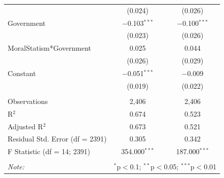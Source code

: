 \documentclass[12pt,]{article}
\begin{document}
\begin{table}[!htbp]
\begin{tabular}{@{\extracolsep{5pt}}lcc}
  & (0.024) & (0.026) \\ 
  Government & $-$0.103$^{***}$ & $-$0.100$^{***}$ \\ 
  & (0.023) & (0.026) \\ 
  MoralStatism*Government & 0.025 & 0.044 \\ 
  & (0.026) & (0.029) \\ 
  Constant & $-$0.051$^{***}$ & $-$0.009 \\ 
  & (0.019) & (0.022) \\ 
 \hline \\[-1.8ex] 
Observations & 2,406 & 2,406 \\ 
R$^{2}$ & 0.674 & 0.523 \\ 
Adjusted R$^{2}$ & 0.673 & 0.521 \\ 
Residual Std. Error (df = 2391) & 0.305 & 0.342 \\ 
F Statistic (df = 14; 2391) & 354.000$^{***}$ & 187.000$^{***}$ \\ 
\hline 
\hline \\[-1.8ex] 
\textit{Note:}  & \multicolumn{2}{r}{$^{*}$p$<$0.1; $^{**}$p$<$0.05; $^{***}$p$<$0.01} \\ 
\end{tabular} 
\end{table}

\clearpage
\end{document}
